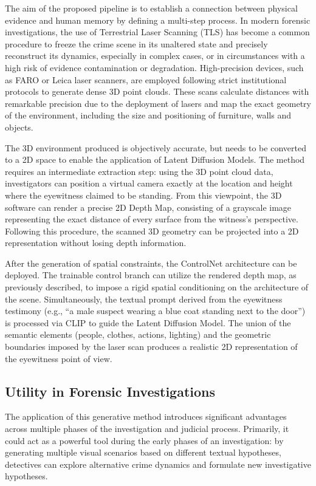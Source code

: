 \documentclass[10pt,twocolumn,letterpaper]{article}
\begin{document}
The aim of the proposed pipeline is to establish a connection between physical evidence and human memory by defining a multi-step process. In modern forensic investigations, the use of Terrestrial Laser Scanning (TLS) \cite{diagnostics13203169, forensicsci1020008} has become a common procedure to freeze the crime scene in its unaltered state and precisely reconstruct its dynamics, especially in complex cases, or in circumstances with a high risk of evidence contamination or degradation. High-precision devices, such as FARO or Leica laser scanners, are employed following strict institutional protocols \cite{ftcoe2022guidelines} to generate dense 3D point clouds. These scans calculate distances with remarkable precision due to the deployment of lasers and map the exact geometry of the environment, including the size and positioning of furniture, walls and objects.

The 3D environment produced is objectively accurate, but needs to be converted to a 2D space to enable the application of Latent Diffusion Models. The method requires an intermediate extraction step: using the 3D point cloud data, investigators can position a virtual camera exactly at the location and height where the eyewitness claimed to be standing. From this viewpoint, the 3D software can render a precise 2D Depth Map, consisting of a grayscale image representing the exact distance of every surface from the witness's perspective. Following this procedure, the scanned 3D geometry can be projected into a 2D representation without losing depth information.

After the generation of spatial constraints, the ControlNet architecture can be deployed. The trainable control branch can utilize the rendered depth map, as previously described, to impose a rigid spatial conditioning on the architecture of the scene. Simultaneously, the textual prompt derived from the eyewitness testimony (e.g., ``a male suspect wearing a blue coat standing next to the door'') is processed via CLIP to guide the Latent Diffusion Model. The union of the semantic elements (people, clothes, actions, lighting) and the geometric boundaries imposed by the laser scan produces a realistic 2D representation of the eyewitness point of view.

\subsection{Utility in Forensic Investigations}

The application of this generative method introduces significant advantages across multiple phases of the investigation and judicial process. Primarily, it could act as a powerful tool during the early phases of an investigation: by generating multiple visual scenarios based on different textual hypotheses, detectives can explore alternative crime dynamics and formulate new investigative hypotheses. 
\end{document}
